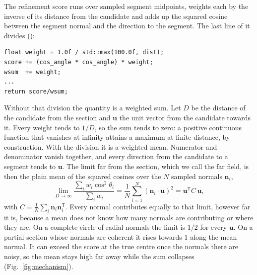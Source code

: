 The refinement score runs over sampled segment midpoints, weights each by the inverse of its
distance from the candidate and adds up the squared cosine between the segment normal and the
direction to the segment. The last line of it divides ():

\begin{center}
\begin{minipage}{0.93\columnwidth}
\footnotesize
\begin{verbatim}
float weight = 1.0f / std::max(100.0f, dist);
score += (cos_angle * cos_angle) * weight;
wsum  += weight;
...
return score/wsum;
\end{verbatim}
\end{minipage}
\end{center}

Without that division the quantity is a weighted sum. Let $D$ be the distance of the candidate
from the section and $\mathbf{u}$ the unit vector from the candidate towards it. Every weight
tends to $1/D$, so the sum tends to zero: a positive continuous function that vanishes at infinity
attains a maximum at finite distance, by construction. With the division it is a weighted mean.
Numerator and denominator vanish together, and every direction from the candidate to a segment
tends to $\mathbf{u}$. The limit far from the section, which we call the far field, is then the
plain mean of the squared cosines over the $N$ sampled normals $\mathbf{n}_i$,
\begin{equation}
\lim_{D\to\infty}\frac{\sum_i w_i\cos^2\theta_i}{\sum_i w_i}
  = \frac{1}{N}\sum_{i=1}^{N}(\mathbf{n}_i\cdot\mathbf{u})^2
  = \mathbf{u}^{\mathsf{T}}C\,\mathbf{u},
\label{eq:farfield}
\end{equation}
with $C=\frac{1}{N}\sum_i\mathbf{n}_i\mathbf{n}_i^{\mathsf{T}}$. Every normal contributes equally
to that limit, however far it is, because a mean does not know how many normals are contributing
or where they are. On a complete circle of radial normals the limit is $1/2$ for every
$\mathbf{u}$. On a partial section whose normals are coherent it rises towards 1 along the mean
normal. It can exceed the score at the true centre once the normals there are noisy, so the mean
stays high far away while the sum collapses (Fig.~\ref{fig:mechanism}).

